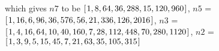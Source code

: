 \documentclass{article}
\newcommand{\Varid}[1]{\mathit{#1}}
\begin{document}
which gives \ensuremath{\Varid{n7}} to be  \ensuremath{[\mskip1.5mu \mathrm{1},\mathrm{8},\mathrm{64},\mathrm{36},\mathrm{288},\mathrm{15},\mathrm{120},\mathrm{960}\mskip1.5mu]}, %
\ensuremath{\Varid{n5}} = \ensuremath{[\mskip1.5mu \mathrm{1},\mathrm{16},\mathrm{6},\mathrm{96},\mathrm{36},\mathrm{576},\mathrm{56},\mathrm{21},\mathrm{336},\mathrm{126},\mathrm{2016}\mskip1.5mu]},
\ensuremath{\Varid{n3}} = \ensuremath{[\mskip1.5mu \mathrm{1},\mathrm{4},\mathrm{16},\mathrm{64},\mathrm{10},\mathrm{40},\mathrm{160},\mathrm{7},\mathrm{28},\mathrm{112},\mathrm{448},\mathrm{70},\mathrm{280},\mathrm{1120}\mskip1.5mu]},
\ensuremath{\Varid{n2}} = \ensuremath{[\mskip1.5mu \mathrm{1},\mathrm{3},\mathrm{9},\mathrm{5},\mathrm{15},\mathrm{45},\mathrm{7},\mathrm{21},\mathrm{63},\mathrm{35},\mathrm{105},\mathrm{315}\mskip1.5mu]}
\end{document}
